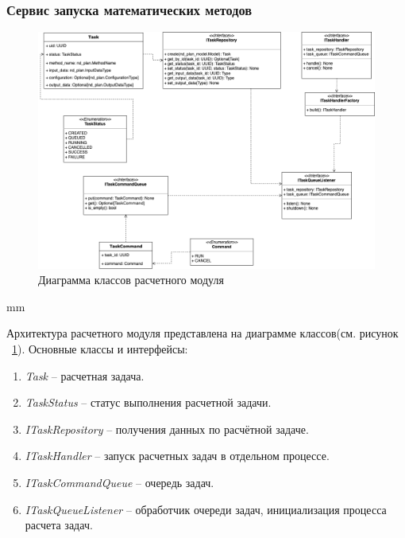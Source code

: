 \subsubsection{\large{Сервис запуска математических методов}}

\begin{figure}[H]
	\includegraphics[width=\textwidth]{architecture/pictures/executor/execution_classes_diagram}
	\caption{Диаграмма классов расчетного модуля}
	\label{pic:architecture__execution-classes-diagram}
\end{figure}
 mm

Архитектура расчетного модуля представлена на диаграмме классов(см. рисунок \ \ref{pic:architecture__execution-classes-diagram}).
Основные классы и интерфейсы:
\begin{enumerate}
	\item \textit{Task} -- расчетная задача.
	\item \textit{TaskStatus} -- статус выполнения расчетной задачи.
	\item \textit{ITaskRepository} -- получения данных по расчётной задаче.
	\item \textit{ITaskHandler} -- запуск расчетных задач в отдельном процессе.
	\item \textit{ITaskCommandQueue} -- очередь задач.
	\item \textit{ITaskQueueListener} -- обработчик очереди задач, инициализация процесса расчета задач.
\end{enumerate}



